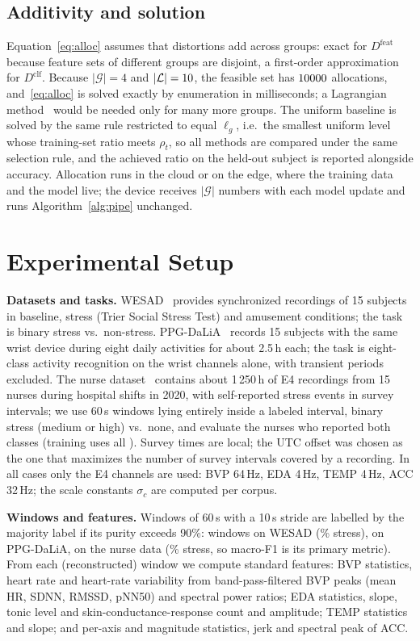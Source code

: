 \documentclass[journal]{IEEEtran}
\begin{document}
\subsection{Additivity and solution}
Equation~\eqref{eq:alloc} assumes that distortions add across groups: exact for $D^{\mathrm{feat}}$ because feature sets of different groups are disjoint, a first-order approximation for $D^{\mathrm{clf}}$. Because $|\mathcal{G}|=4$ and $|\mathcal{L}|=10$, the feasible set has $10000$ allocations, and~\eqref{eq:alloc} is solved exactly by enumeration in milliseconds; a Lagrangian method~\cite{shoham1988} would be needed only for many more groups. The uniform baseline is solved by the same rule restricted to equal $\ell_g$, i.e.\ the smallest uniform level whose training-set ratio meets $\rho_t$, so all methods are compared under the same selection rule, and the achieved ratio on the held-out subject is reported alongside accuracy. Allocation runs in the cloud or on the edge, where the training data and the model live; the device receives $|\mathcal{G}|$ numbers with each model update and runs Algorithm~\ref{alg:pipe} unchanged.

\section{Experimental Setup}
\label{sec:setup}
\textbf{Datasets and tasks.} WESAD~\cite{schmidt2018} provides synchronized recordings of 15 subjects in baseline, stress (Trier Social Stress Test) and amusement conditions; the task is binary stress vs.\ non-stress. PPG-DaLiA~\cite{reiss2019} records 15 subjects with the same wrist device during eight daily activities for about 2.5\,h each; the task is eight-class activity recognition on the wrist channels alone, with transient periods excluded. The nurse dataset~\cite{hosseini2022} contains about 1\,250\,h of E4 recordings from 15 nurses during hospital shifts in 2020, with self-reported stress events in survey intervals; we use 60\,s windows lying entirely inside a labeled interval, binary stress (medium or high) vs.\ none, and evaluate the \nurseNSubjects{} nurses who reported both classes (training uses all \nurseNAll). Survey times are local; the UTC offset was chosen as the one that maximizes the number of survey intervals covered by a recording. In all cases only the E4 channels are used: BVP 64\,Hz, EDA 4\,Hz, TEMP 4\,Hz, ACC 32\,Hz; the scale constants $\sigma_c$ are computed per corpus.

\textbf{Windows and features.} Windows of 60\,s with a 10\,s stride are labelled by the majority label if its purity exceeds 90\%: \nWindows{} windows on WESAD (\pctStress\% stress), \daliaNWindows{} on PPG-DaLiA, \nurseNWindows{} on the nurse data (\nursePctStress\% stress, so macro-F1 is its primary metric). From each (reconstructed) window we compute \nFeatures{} standard features: BVP statistics, heart rate and heart-rate variability from band-pass-filtered BVP peaks (mean HR, SDNN, RMSSD, pNN50) and spectral power ratios; EDA statistics, slope, tonic level and skin-conductance-response count and amplitude; TEMP statistics and slope; and per-axis and magnitude statistics, jerk and spectral peak of ACC.
\end{document}
